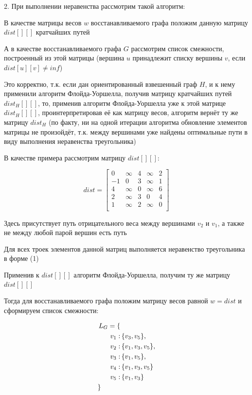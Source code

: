 \documentclass{report}
\begin{document}
2. При выполнении неравенства рассмотрим такой алгоритм:

В качестве матрицы весов $w$ восстанавливаемого графа положим данную матрицу $dist[][]$ кратчайших путей

А в качестве восстанавливаемого графа $G$ рассмотрим список смежности, построенный из этой матрицы
(вершина $u$ принадлежит списку вершины $v$, если $dist[u][v] \ne inf$)

Это корректно, т.к. если дан ориентированный взвешенный граф $H$, и к нему применили алгоритм Флойда-Уоршелла, получив
матрицу кратчайших путей $dist_H[][]$, то, применив алгоритм Флойда-Уоршелла уже к этой матрице $dist_H[][]$, проинтерпретировав
её как матрицу весов, алгоритм вернёт ту же матрицу $dist_H$ (по факту, ни на одной итерации алгоритма обновление элементов
матрицы не произойдёт, т.к. между вершинами уже найдены оптимальные пути в виду выполнения неравенства треугольника)

В качестве примера рассмотрим матрицу $dist[][]$:

$$
dist = \begin{bmatrix}
     0 & \infty & 4 & \infty & 2 \\
    -1 &  0 & 3 & \infty & 1 \\
     4 & \infty & 0 & \infty & 6 \\
     2 & \infty & 3 &  0 & 4 \\ 
     1 & \infty & 2 & \infty & 0 \\
\end{bmatrix}
$$

Здесь присутствует путь отрицательного веса между вершинами $v_2$ и $v_1$, а также не между любой парой вершин есть путь

Для всех троек элементов данной матриц выполняется неравенство треугольника в форме (1)

Применив к $dist[][]$ алгоритм Флойда-Уоршелла, получим ту же матрицу $dist[][]$

Тогда для восстанавливаемого графа положим матрицу весов равной $ w = dist $ и сформируем список смежности:

\begin{align*}
    L_G = \{ & \\
        v_1: & \, \{ v_3, v_5 \}, \\
        v_2: & \, \{ v_1, v_3, v_5 \}, \\
        v_3: & \, \{ v_1, v_5 \}, \\
        v_4: & \, \{ v_1, v_3, v_5 \} \\
        v_5: & \, \{ v_1, v_3 \} \\
    \} \hspace*{1cm} & \\
\end{align*}
\end{document}
